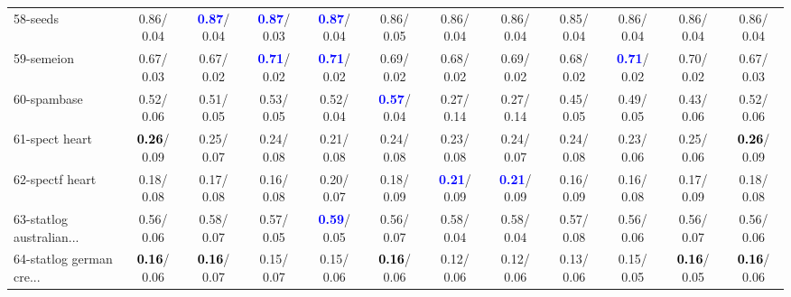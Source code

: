 \begin{table}[h]
\begin{center}
{\begin{tabular}{lc|c|c|c|c|c|c|c|c|c|c}
58-seeds &   0.86/  0.04 & \textcolor{blue}{\textbf{  0.87}}/  0.04 & \textcolor{blue}{\textbf{  0.87}}/  0.03 & \textcolor{blue}{\textbf{  0.87}}/  0.04 &   0.86/  0.05 &   0.86/  0.04 &   0.86/  0.04 &   0.85/  0.04 &   0.86/  0.04 &   0.86/  0.04 &   0.86/  0.04 \\
59-semeion &   0.67/  0.03 &   0.67/  0.02 & \textcolor{blue}{\textbf{  0.71}}/  0.02 & \textcolor{blue}{\textbf{  0.71}}/  0.02 &   0.69/  0.02 &   0.68/  0.02 &   0.69/  0.02 &   0.68/  0.02 & \textcolor{blue}{\textbf{  0.71}}/  0.02 &   0.70/  0.02 &   0.67/  0.03 \\
60-spambase &   0.52/  0.06 &   0.51/  0.05 &   0.53/  0.05 &   0.52/  0.04 & \textcolor{blue}{\textbf{  0.57}}/  0.04 &   0.27/  0.14 &   0.27/  0.14 &   0.45/  0.05 &   0.49/  0.05 &   0.43/  0.06 &   0.52/  0.06 \\ \hline
61-spect heart & \textcolor{black}{\textbf{  0.26}}/  0.09 &   0.25/  0.07 &   0.24/  0.08 &   0.21/  0.08 &   0.24/  0.08 &   0.23/  0.08 &   0.24/  0.07 &   0.24/  0.08 &   0.23/  0.06 &   0.25/  0.06 & \textcolor{black}{\textbf{  0.26}}/  0.09 \\
62-spectf heart &   0.18/  0.08 &   0.17/  0.08 &   0.16/  0.08 &   0.20/  0.07 &   0.18/  0.09 & \textcolor{blue}{\textbf{  0.21}}/  0.09 & \textcolor{blue}{\textbf{  0.21}}/  0.09 &   0.16/  0.09 &   0.16/  0.08 &   0.17/  0.09 &   0.18/  0.08 \\
63-statlog australian... &   0.56/  0.06 &   0.58/  0.07 &   0.57/  0.05 & \textcolor{blue}{\textbf{  0.59}}/  0.05 &   0.56/  0.07 &   0.58/  0.04 &   0.58/  0.04 &   0.57/  0.08 &   0.56/  0.06 &   0.56/  0.07 &   0.56/  0.06 \\
64-statlog german cre... & \textcolor{black}{\textbf{  0.16}}/  0.06 & \textcolor{black}{\textbf{  0.16}}/  0.07 &   0.15/  0.07 &   0.15/  0.06 & \textcolor{black}{\textbf{  0.16}}/  0.06 &   0.12/  0.06 &   0.12/  0.06 &   0.13/  0.06 &   0.15/  0.05 & \textcolor{black}{\textbf{  0.16}}/  0.05 & \textcolor{black}{\textbf{  0.16}}/  0.06 \\\end{tabular}}\label{stratsALCKappa1a5NNaRedux}
\end{center}
\end{table}
